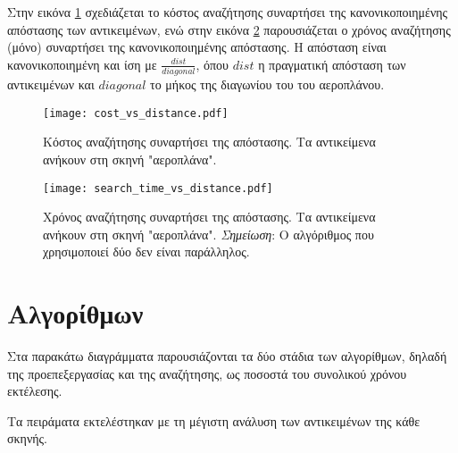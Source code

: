 Στην εικόνα \ref{fig:cost_metric_vs_distance} 
σχεδιάζεται το κόστος αναζήτησης συναρτήσει της 
κανονικοποιημένης απόστασης των αντικειμένων, 
ενώ στην εικόνα \ref{fig:search_time_vs_distance} 
παρουσιάζεται ο χρόνος αναζήτησης (μόνο) συναρτήσει 
της κανονικοποιημένης απόστασης. 
Η απόσταση είναι κανονικοποιημένη και ίση με 
$\frac{dist}{diagonal}$, όπου $dist$ η πραγματική 
απόσταση των αντικειμένων και $diagonal$ το μήκος 
της διαγωνίου του  του αεροπλάνου.


\begin{figure}[H]
    \centering
    \texttt{[image: cost\_vs\_distance.pdf]}
    \caption[Κόστος Αναζήτησης Συναρτήσει της Απόστασης"] {
        Κόστος αναζήτησης συναρτήσει της απόστασης.
        Τα αντικείμενα ανήκουν στη σκηνή "αεροπλάνα".
    }
    \label{fig:cost_metric_vs_distance}
\end{figure}

\begin{figure}[H]
    \centering
    \texttt{[image: search\_time\_vs\_distance.pdf]}
    \caption[Χρόνος Αναζήτησης Συναρτήσει της Απόστασης"] {
        Χρόνος αναζήτησης συναρτήσει της απόστασης.
        Τα αντικείμενα ανήκουν στη σκηνή "αεροπλάνα".
        \textit{Σημείωση}: Ο αλγόριθμος που χρησιμοποιεί δύο  δεν 
        είναι παράλληλος.
    }
    \label{fig:search_time_vs_distance}
\end{figure}

\section{ Αλγορίθμων}
\label{sec:profiling}
Στα παρακάτω διαγράμματα παρουσιάζονται τα δύο στάδια των 
αλγορίθμων, δηλαδή της προεπεξεργασίας και της αναζήτησης,
ως ποσοστά του συνολικού χρόνου εκτέλεσης. 

Τα πειράματα εκτελέστηκαν με τη μέγιστη ανάλυση 
των αντικειμένων της κάθε σκηνής.



